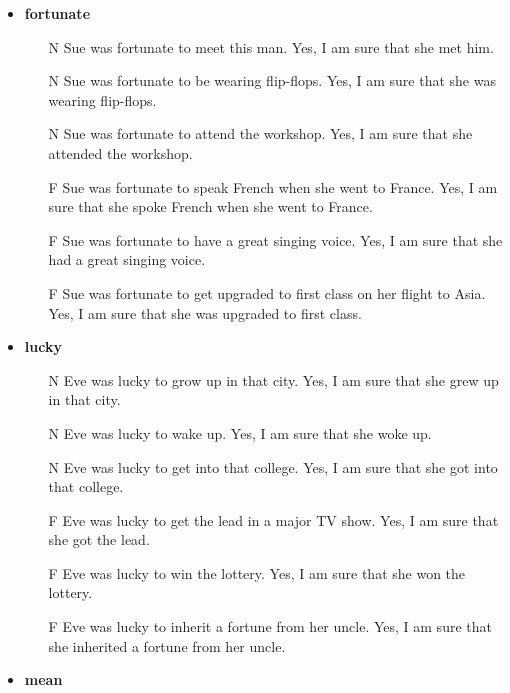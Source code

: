 \documentclass[11pt,fleqn]{article}
\newcommand{\6}{\mbox{$[\hspace*{-.6mm}[$}}
\newcommand{\9}{\mbox{$]\hspace*{-.6mm}]$}}
\begin{document}
\begin{itemize}[itemsep=-1pt]
\begin{enumerate}[topsep=0pt,itemsep=-4pt]
\end{enumerate}

\item {\bf fortunate}

\begin{enumerate}[topsep=0pt,itemsep=-4pt]

\item[N]  	Sue was fortunate to meet this man.	Yes, I am sure that she met him.
\item[N]  	Sue was fortunate to be wearing flip-flops.	Yes, I am sure that she was wearing flip-flops.
\item[N]  	Sue was fortunate to attend the workshop.	Yes, I am sure that she attended the workshop.
\item[F]  	Sue was fortunate to speak French when she went to France.	Yes, I am sure that she spoke French when she went to France.
\item[F]  	Sue was fortunate to have a great singing voice.	Yes, I am sure that she had a great singing voice.
\item[F]  	Sue was fortunate to get upgraded to first class on her flight to Asia.	Yes, I am sure that she was upgraded to first class.

\end{enumerate}

\item {\bf lucky}

\begin{enumerate}[topsep=0pt,itemsep=-4pt]

\item[N]  	Eve was lucky to grow up in that city.	Yes, I am sure that she grew up in that city.
\item[N]  	Eve was lucky to wake up.	Yes, I am sure that she woke up.
\item[N]  	Eve was lucky to get into that college.	Yes, I am sure that she got into that college.
\item[F]  	Eve was lucky to get the lead in a major TV show.	Yes, I am sure that she got the lead.
\item[F]  	Eve was lucky to win the lottery.	Yes, I am sure that she won the lottery.
\item[F]  	Eve was lucky to inherit a fortune from her uncle. 	Yes, I am sure that she inherited a fortune from her uncle.

\end{enumerate}

\item {\bf mean}


\end{itemize}
\end{document}

